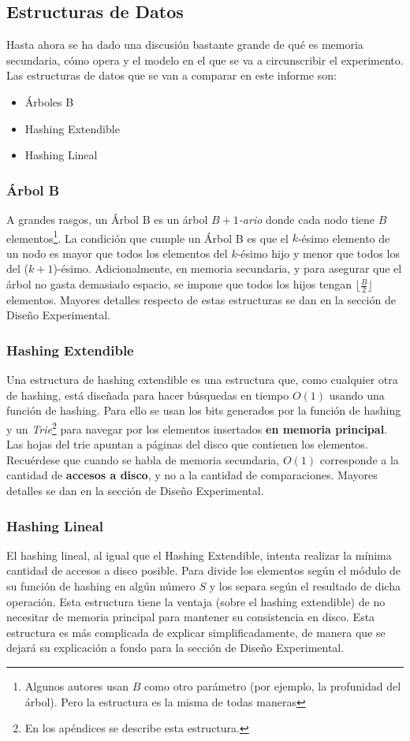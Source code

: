 \documentclass[12pt,letterpaper]{report}
\begin{document}
\subsection{Estructuras de Datos}
Hasta ahora se ha dado una discusión bastante grande de qué es memoria secundaria, cómo opera y el modelo en el que se va a circunscribir el experimento. Las estructuras de datos que se van a comparar en este informe son:

\begin{itemize}
\item Árboles B
\item Hashing Extendible
\item Hashing Lineal
\end{itemize}

\subsubsection{Árbol B}
A grandes rasgos, un Árbol B es un árbol $B+1$\emph{-ario} donde cada nodo tiene $B$ elementos\footnote{Algunos autores usan $B$ como otro parámetro (por ejemplo, la profunidad del árbol). Pero la estructura es la misma de todas maneras}. La condición que cumple un Árbol B es que el $k$-ésimo elemento de un nodo es mayor que todos los elementos del $k$-ésimo hijo y menor que todos los del ($k+1$)-ésimo. Adicionalmente, en memoria secundaria, y para asegurar que el árbol no gasta demasiado espacio, se impone que todos los hijos tengan $\lfloor \frac{B}{2} \rfloor$ elementos. Mayores detalles respecto de estas estructuras se dan en la sección de Diseño Experimental.

\subsubsection{Hashing Extendible}
Una estructura de hashing extendible es una estructura que, como cualquier otra de hashing, está diseñada para hacer búsquedas en tiempo $O(1)$ usando una función de hashing. Para ello se usan los bits generados por la función de hashing y un \emph{Trie}\footnote{En los apéndices se describe esta estructura.} para navegar por los elementos insertados \textbf{en memoria principal}. Las hojas del trie apuntan a páginas del disco que contienen los elementos. Recuérdese que cuando se habla de memoria secundaria, $O(1)$ corresponde a la cantidad de \textbf{accesos a disco}, y no a la cantidad de comparaciones. Mayores detalles se dan en la sección de Diseño Experimental.

\subsubsection{Hashing Lineal}
El hashing lineal, al igual que el Hashing Extendible, intenta realizar la mínima cantidad de accesos a disco posible. Para divide los elementos según el módulo de su función de hashing en algún número $S$ y los separa según el resultado de dicha operación. Esta estructura tiene la ventaja (sobre el hashing extendible) de no necesitar de memoria principal para mantener su consistencia en disco. Esta estructura es más complicada de explicar simplificadamente, de manera que se dejará su explicación a fondo para la sección de Diseño Experimental.
\end{document}
